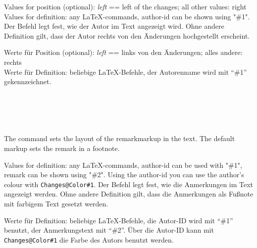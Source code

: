 Values for position (optional): \emph{left} == left of the changes; all other values: right\\
Values for definition: any \LaTeX-commands, author-id can be shown using "\#1".
\fi
\ifGERMAN
	Der Befehl  legt fest, wie der Autor im Text angezeigt wird.
	Ohne andere Definition gilt, dass der Autor rechts von den Änderungen hochgestellt erscheint.

	Werte für Position (optional): \emph{left} == links von den Änderungen; alles andere: rechts\\
	Werte für Definition: beliebige \LaTeX-Befehle, der Autorenname wird mit "`\#1"' gekennzeichnet.
\fi
\begin{chusage}
\>
\end{chusage}
\begin{chusage}[true]
\>\\
\>\\
\>\\
\>
\end{chusage}

\subsubsection{}
\DescribeMacro{\setremarkmarkup}
\ifENGLISH
The command  sets the layout of the remarkmarkup in the text.
The default markup sets the remark in a footnote.

Values for definition: any \LaTeX-commands, author-id can be used with "\#1", remark can be shown using "\#2".
Using the author-id you can use the author's colour with \texttt{Changes@Color\#1}.
\fi
\ifGERMAN
	Der Befehl  legt fest, wie die Anmerkungen im Text angezeigt werden.
	Ohne andere Definition gilt, dass die Anmerkungen als Fußnote mit farbigem Text gesetzt werden.

	Werte für Definition: beliebige \LaTeX-Befehle, die Autor-ID wird mit "`\#1"' benutzt, der Anmerkungstext mit "`\#2"'.
	Über die Autor-ID kann mit \texttt{Changes@Color\#1} die Farbe des Autors benutzt werden.
\fi
\begin{chusage}
\>
\end{chusage}
\begin{chusage}[true]
\>\\
\>
\end{chusage}

